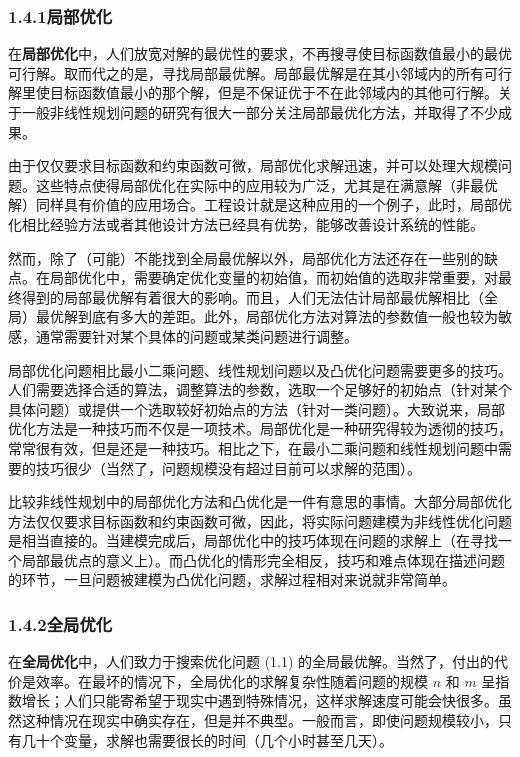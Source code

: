 \documentclass[UTF8,12pt,a4paper,fontset=fandol]{ctexart}
\begin{document}
\subsubsection*{1.4.1\quad 局部优化}

在\textbf{局部优化}中，人们放宽对解的最优性的要求，不再搜寻使目标函数值最小的最优可行解。取而代之的是，寻找局部最优解。局部最优解是在其小邻域内的所有可行解里使目标函数值最小的那个解，但是不保证优于不在此邻域内的其他可行解。关于一般非线性规划问题的研究有很大一部分关注局部最优化方法，并取得了不少成果。

由于仅仅要求目标函数和约束函数可微，局部优化求解迅速，并可以处理大规模问题。这些特点使得局部优化在实际中的应用较为广泛，尤其是在满意解（非最优解）同样具有价值的应用场合。工程设计就是这种应用的一个例子，此时，局部优化相比经验方法或者其他设计方法已经具有优势，能够改善设计系统的性能。

然而，除了（可能）不能找到全局最优解以外，局部优化方法还存在一些别的缺点。在局部优化中，需要确定优化变量的初始值，而初始值的选取非常重要，对最终得到的局部最优解有着很大的影响。而且，人们无法估计局部最优解相比（全局）最优解到底有多大的差距。此外，局部优化方法对算法的参数值一般也较为敏感，通常需要针对某个具体的问题或某类问题进行调整。

局部优化问题相比最小二乘问题、线性规划问题以及凸优化问题需要更多的技巧。人们需要选择合适的算法，调整算法的参数，选取一个足够好的初始点（针对某个具体问题）或提供一个选取较好初始点的方法（针对一类问题）。大致说来，局部优化方法是一种技巧而不仅是一项技术。局部优化是一种研究得较为透彻的技巧，常常很有效，但是还是一种技巧。相比之下，在最小二乘问题和线性规划问题中需要的技巧很少（当然了，问题规模没有超过目前可以求解的范围）。

比较非线性规划中的局部优化方法和凸优化是一件有意思的事情。大部分局部优化方法仅仅要求目标函数和约束函数可微，因此，将实际问题建模为非线性优化问题是相当直接的。当建模完成后，局部优化中的技巧体现在问题的求解上（在寻找一个局部最优点的意义上）。而凸优化的情形完全相反，技巧和难点体现在描述问题的环节，一旦问题被建模为凸优化问题，求解过程相对来说就非常简单。

\subsubsection*{1.4.2\quad 全局优化}

在\textbf{全局优化}中，人们致力于搜索优化问题 (1.1) 的全局最优解。当然了，付出的代价是效率。在最坏的情况下，全局优化的求解复杂性随着问题的规模 $n$ 和 $m$ 呈指数增长；人们只能寄希望于现实中遇到特殊情况，这样求解速度可能会快很多。虽然这种情况在现实中确实存在，但是并不典型。一般而言，即使问题规模较小，只有几十个变量，求解也需要很长的时间（几个小时甚至几天）。
\end{document}
